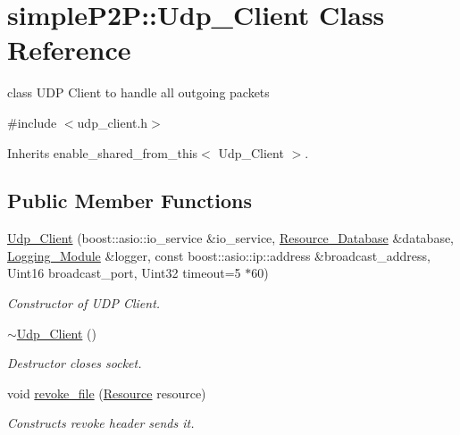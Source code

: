 \hypertarget{classsimpleP2P_1_1Udp__Client}{}\section{simple\+P2P\+:\+:Udp\+\_\+\+Client Class Reference}
\label{classsimpleP2P_1_1Udp__Client}


class U\+DP Client to handle all outgoing packets  




{\ttfamily \#include $<$udp\+\_\+client.\+h$>$}



Inherits enable\+\_\+shared\+\_\+from\+\_\+this$<$ Udp\+\_\+\+Client $>$.

\subsection*{Public Member Functions}
\begin{DoxyCompactItemize}
\item 
\hyperlink{classsimpleP2P_1_1Udp__Client_a1c904ca43ce865a07572d94aecb48871}{Udp\+\_\+\+Client} (boost\+::asio\+::io\+\_\+service \&io\+\_\+service, \hyperlink{classsimpleP2P_1_1Resource__Database}{Resource\+\_\+\+Database} \&database, \hyperlink{classsimpleP2P_1_1Logging__Module}{Logging\+\_\+\+Module} \&logger, const boost\+::asio\+::ip\+::address \&broadcast\+\_\+address, Uint16 broadcast\+\_\+port, Uint32 timeout=5 $\ast$60)
\begin{DoxyCompactList}\small\item\em Constructor of U\+DP Client. \end{DoxyCompactList}\item 
\mbox{\label{classsimpleP2P_1_1Udp__Client_a710c95899ddcfba71004d780ab4c1e4d}} 
\hyperlink{classsimpleP2P_1_1Udp__Client_a710c95899ddcfba71004d780ab4c1e4d}{$\sim$\+Udp\+\_\+\+Client} ()
\begin{DoxyCompactList}\small\item\em Destructor closes socket. \end{DoxyCompactList}\item 
void \hyperlink{classsimpleP2P_1_1Udp__Client_a459f622d0f3671d48d33bce035f5de90}{revoke\+\_\+file} (\hyperlink{classsimpleP2P_1_1Resource}{Resource} resource)
\begin{DoxyCompactList}\small\item\em Constructs revoke header sends it. \end{DoxyCompactList}\end{DoxyCompactItemize}


